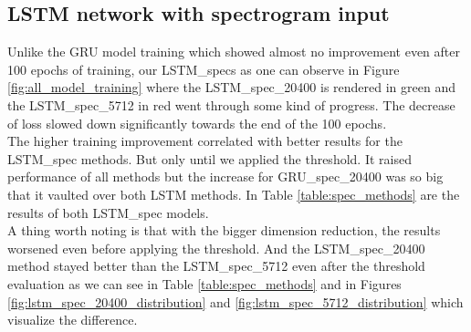 \subsection{LSTM network with spectrogram input}\label{ssec:LSTM_spec_results}

Unlike the GRU model training which showed almost no improvement even after 100 epochs of training, our LSTM\_specs as one can observe in Figure \ref{fig:all_model_training} where the LSTM\_spec\_20400 is rendered in green and the LSTM\_spec\_5712 in red went through some kind of progress. The decrease of loss slowed down significantly towards the end of the 100 epochs. \\
The higher training improvement correlated with better results for the LSTM\_spec methods. But only until we applied the threshold. It raised performance of all methods but the increase for GRU\_spec\_20400 was so big that it vaulted over both LSTM methods. In Table \ref{table:spec_methods} are the results of both LSTM\_spec models. \\
A thing worth noting is that with the bigger dimension reduction, the results worsened even before applying the threshold. And the LSTM\_spec\_20400 method stayed better than the LSTM\_spec\_5712 even after the threshold evaluation as we can see in Table \ref{table:spec_methods} and in Figures \ref{fig:lstm_spec_20400_distribution} and \ref{fig:lstm_spec_5712_distribution} which visualize the difference.

